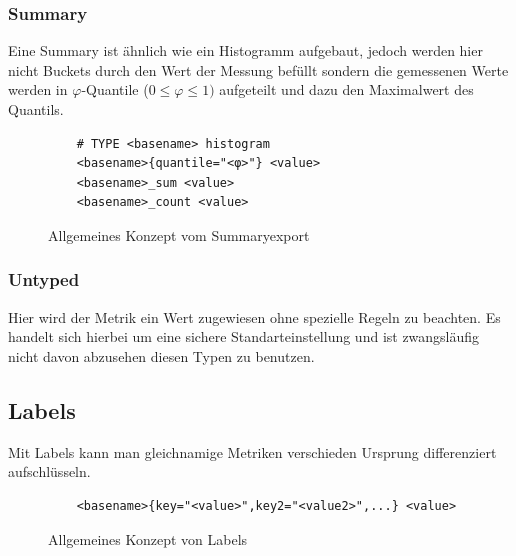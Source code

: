 \subsubsection{Summary}
Eine Summary ist ähnlich wie ein Histogramm aufgebaut, jedoch werden hier nicht Buckets durch den Wert der Messung befüllt sondern die gemessenen Werte werden in $\varphi$-Quantile ($0 \le \varphi \le 1)$ aufgeteilt und dazu den Maximalwert des Quantils.
\begin{figure}[hbt!]
	\begin{verbatim}
	# TYPE <basename> histogram
	<basename>{quantile="<φ>"} <value>
	<basename>_sum <value>
	<basename>_count <value>
	\end{verbatim}
	\caption{Allgemeines Konzept vom Summaryexport}
\end{figure}
\subsubsection{Untyped}
Hier wird der Metrik ein Wert zugewiesen ohne spezielle Regeln zu beachten. Es handelt sich hierbei um eine sichere Standarteinstellung und ist zwangsläufig nicht davon abzusehen diesen Typen zu benutzen.
\subsection{Labels}
Mit Labels kann man gleichnamige Metriken verschieden Ursprung differenziert aufschlüsseln. 
\begin{figure}[!ht]
	\begin{verbatim}
	<basename>{key="<value>",key2="<value2>",...} <value>
	\end{verbatim}
	\caption{Allgemeines Konzept von Labels}
\end{figure}
